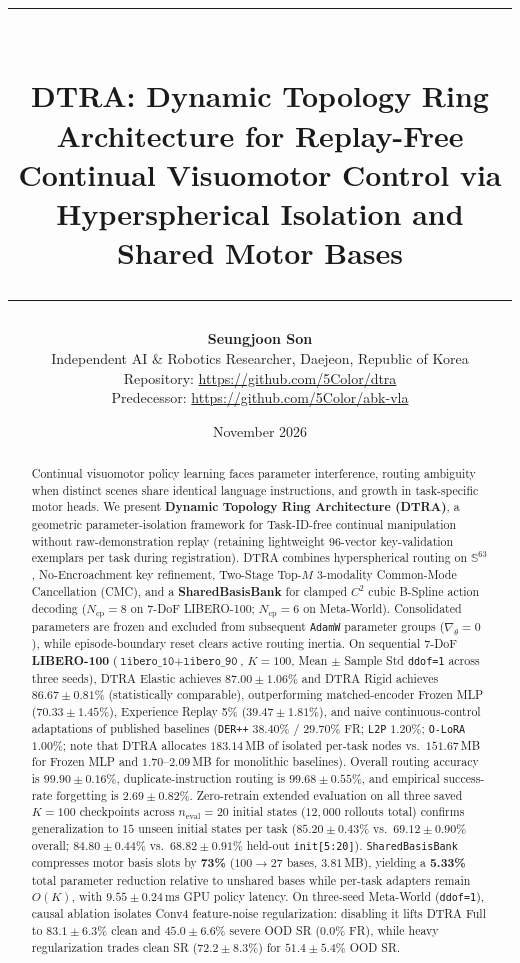 \documentclass[10pt]{article}
\title{\vspace{-2.3em}\rule{\linewidth}{2pt}\\[0.32em]\textbf{DTRA: Dynamic Topology Ring Architecture for Replay-Free Continual Visuomotor Control via Hyperspherical Isolation and Shared Motor Bases}\\[0.25em]\rule{\linewidth}{0.8pt}\vspace{-0.85em}}
\author{
  \textbf{Seungjoon Son}\\
  Independent AI \& Robotics Researcher, Daejeon, Republic of Korea\\
  Repository: \url{https://github.com/5Color/dtra}\\
  Predecessor: \url{https://github.com/5Color/abk-vla}
}
\date{November 2026}
\begin{document}
\maketitle

\begin{abstract}
Continual visuomotor policy learning faces parameter interference, routing ambiguity when distinct scenes share identical language instructions, and growth in task-specific motor heads. We present \textbf{Dynamic Topology Ring Architecture (DTRA)}, a geometric parameter-isolation framework for Task-ID-free continual manipulation without raw-demonstration replay (retaining lightweight 96-vector key-validation exemplars per task during registration). DTRA combines hyperspherical routing on $\mathbb{S}^{63}$, No-Encroachment key refinement, Two-Stage Top-$M$ 3-modality Common-Mode Cancellation (CMC), and a \textbf{SharedBasisBank} for clamped $C^2$ cubic B-Spline action decoding ($N_{\text{cp}}=8$ on 7-DoF LIBERO-100; $N_{\text{cp}}=6$ on Meta-World). Consolidated parameters are frozen and excluded from subsequent \texttt{AdamW} parameter groups ($\nabla_\theta=0$), while episode-boundary reset clears active routing inertia. On sequential 7-DoF \textbf{LIBERO-100} ($\texttt{libero\_10}+\texttt{libero\_90}$, $K=100$, Mean $\pm$ Sample Std \texttt{ddof=1} across three seeds), DTRA Elastic achieves $\mathbf{87.00 \pm 1.06}$\% and DTRA Rigid achieves $86.67 \pm 0.81$\% (statistically comparable), outperforming matched-encoder Frozen MLP ($70.33 \pm 1.45$\%), Experience Replay 5\% ($39.47 \pm 1.81$\%), and naive continuous-control adaptations of published baselines (\texttt{DER++} $38.40\%$ / $29.70\%$ FR; \texttt{L2P} $1.20\%$; \texttt{O-LoRA} $1.00\%$; note that DTRA allocates $183.14\,$MB of isolated per-task nodes vs.\ $151.67\,$MB for Frozen MLP and $1.70\text{--}2.09\,$MB for monolithic baselines). Overall routing accuracy is $99.90 \pm 0.16$\%, duplicate-instruction routing is $\mathbf{99.68 \pm 0.55}$\%, and empirical success-rate forgetting is $2.69 \pm 0.82$\%. Zero-retrain extended evaluation on all three saved $K=100$ checkpoints across $n_{\text{eval}}=20$ initial states ($12{,}000$ rollouts total) confirms generalization to $15$ unseen initial states per task ($\mathbf{85.20 \pm 0.43}\%$ vs.\ $69.12 \pm 0.90\%$ overall; $\mathbf{84.80 \pm 0.44}\%$ vs.\ $68.82 \pm 0.91\%$ held-out \texttt{init[5:20]}). \texttt{SharedBasisBank} compresses motor basis slots by \textbf{73\%} ($100 \to 27$ bases, $3.81\,$MB), yielding a \textbf{5.33\%} total parameter reduction relative to unshared bases while per-task adapters remain $O(K)$, with $9.55 \pm 0.24$\,ms GPU policy latency. On three-seed Meta-World (\texttt{ddof=1}), causal ablation isolates Conv4 feature-noise regularization: disabling it lifts DTRA Full to $\mathbf{83.1 \pm 6.3}\%$ clean and $\mathbf{45.0 \pm 6.6}\%$ severe OOD SR ($0.0\%$ FR), while heavy regularization trades clean SR ($72.2 \pm 8.3\%$) for $51.4 \pm 5.4\%$ OOD SR.
\end{abstract}
\end{document}
